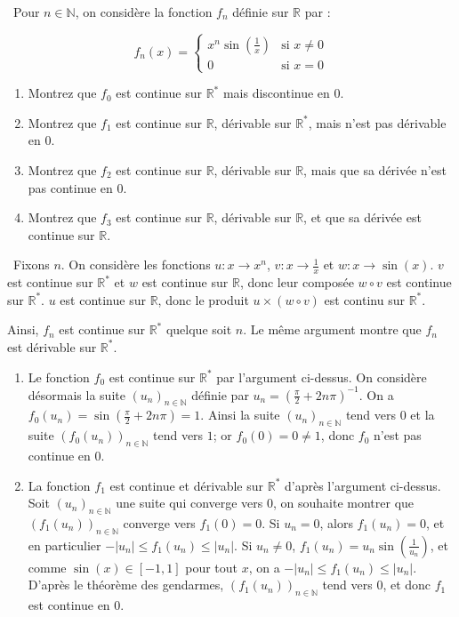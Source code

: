 \documentclass[a4paper,12pt]{exam}
\begin{document}
\begin{questions}

\question\ 
 Pour $n\in\mathbb N$, on considère la fonction $f_n$ définie sur $\mathbb R$ par :
 
 $$f_n(x)=\left\{\begin{array}{lc}x^n \sin(\tfrac{1}{x})&\text{si }x\neq 0\\0&\text{si }x=0\end{array}\right.$$
 
 \begin{enumerate}
  \item Montrez que $f_0$ est continue sur $\mathbb R^*$ mais discontinue en $0$.
  \item Montrez que $f_1$ est continue sur $\mathbb R$, dérivable sur $\mathbb R^*$, mais n'est pas dérivable en $0$.
  \item Montrez que $f_2$ est continue sur $\mathbb R$, dérivable sur $\mathbb R$, mais que sa dérivée n'est pas continue en $0$.
  \item Montrez que $f_3$ est continue sur $\mathbb R$, dérivable sur $\mathbb R$, et que sa dérivée est continue sur $\mathbb R$.
 \end{enumerate}
 
 \begin{solution}\ 
 Fixons $n$. On considère les fonctions $u: x\rightarrow x^n$, $v: x\rightarrow \tfrac1x$ et $w: x\rightarrow\sin(x)$. $v$ est continue sur $\mathbb R^*$ et $w$ est continue sur $\mathbb R$, donc leur composée $w\circ v$ est continue sur $\mathbb R^*$. $u$ est continue sur $\mathbb R$, donc le produit $u\times(w\circ v)$ est continu sur $\mathbb R^*$.
 
 Ainsi, $f_n$ est continue sur $\mathbb R^*$ quelque soit $n$. Le même argument montre que $f_n$ est dérivable sur $\mathbb R^*$.
 
 \begin{enumerate}
  \item Le fonction $f_0$ est continue sur $\mathbb R^*$ par l'argument ci-dessus. On considère désormais la suite $(u_n)_{n\in\mathbb N}$ définie par $u_n=(\tfrac{\pi}{2}+2n\pi)^{-1}$. On a $f_0(u_n)=\sin(\tfrac{\pi}{2}+2n\pi)=1$. Ainsi la suite $(u_n)_{n\in\mathbb N}$ tend vers $0$ et la suite $(f_0(u_n))_{n\in\mathbb N}$ tend vers $1$; or $f_0(0)=0\neq1$, donc $f_0$ n'est pas continue en $0$.
  \item La fonction $f_1$ est continue et dérivable sur $\mathbb R^*$ d'après l'argument ci-dessus. Soit $(u_n)_{n\in\mathbb N}$ une suite qui converge vers $0$, on souhaite montrer que $(f_1(u_n))_{n\in\mathbb N}$ converge vers $f_1(0)=0$. Si $u_n=0$, alors $f_1(u_n)=0$, et en particulier $-|u_n|\leqslant f_1(u_n)\leqslant|u_n|$. Si $u_n\neq0$, $f_1(u_n)=u_n\sin(\tfrac{1}{u_n})$, et comme $\sin(x)\in[-1,1]$ pour tout $x$, on a $-|u_n|\leqslant f_1(u_n)\leqslant|u_n|$. D'après le théorème des gendarmes, $(f_1(u_n))_{n\in\mathbb N}$ tend vers $0$, et donc $f_1$ est continue en $0$.  
  

\end{enumerate}
\end{solution}
\end{questions}
\end{document}
